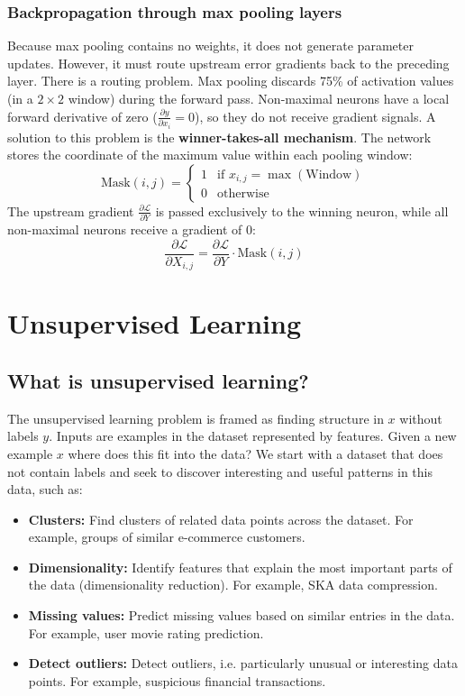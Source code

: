 \documentclass[11pt]{article}
\begin{document}
\subsubsection{Backpropagation through max pooling layers}
Because max pooling contains no weights, it does not generate parameter updates. However, it must route upstream error gradients back to the preceding layer.
There is a routing problem. Max pooling discards 75\% of activation values (in a $2\times 2$ window) during the forward pass. Non-maximal neurons have a local forward derivative of zero ($\frac{\partial y}{\partial x_i}=0$), so they do not receive gradient signals.
A solution to this problem is the \textbf{winner-takes-all mechanism}. The network stores the coordinate of the maximum value within each pooling window:
$$
\text{Mask}(i,j)=\begin{cases}
    1 & \text{if }x_{i,j}=\max(\text{Window}) \\
    0 & \text{otherwise}
\end{cases}
$$
The upstream gradient $\frac{\partial \mathcal{L}}{\partial Y}$ is passed exclusively to the winning neuron, while all non-maximal neurons receive a gradient of 0:
$$
\frac{\partial \mathcal{L}}{\partial X_{i,j}}=\frac{\partial \mathcal{L}}{\partial Y}\cdot\text{Mask}(i,j)
$$

\section{Unsupervised Learning}
\subsection{What is unsupervised learning?}
The unsupervised learning problem is framed as finding structure in $x$ without labels $y$. Inputs are examples in the dataset represented by features.
Given a new example $x$ where does this fit into the data? We start with a dataset that does not contain labels and seek to discover interesting and useful patterns in this data, such as:
\begin{itemize}
    \item \textbf{Clusters:} Find clusters of related data points across the dataset. For example, groups of similar e-commerce customers.
    \item \textbf{Dimensionality:} Identify features that explain the most important parts of the data (dimensionality reduction). For example, SKA data compression.
    \item \textbf{Missing values:} Predict missing values based on similar entries in the data. For example, user movie rating prediction.
    \item \textbf{Detect outliers:} Detect outliers, i.e. particularly unusual or interesting data points. For example, suspicious financial transactions.
\end{itemize}
\end{document}
